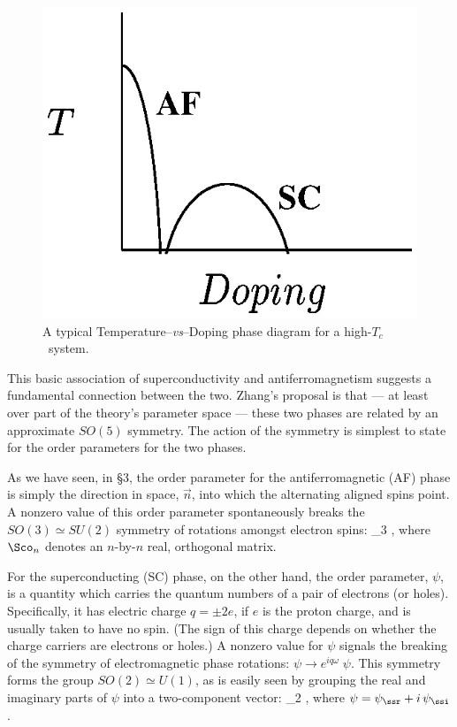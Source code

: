 \documentclass[12pt,epsf]{report}
\def\Tc{$T_c$}
\begin{document}
\begin{figure}
\includegraphics{Pdiag.eps}
\caption{A typical Temperature--{\it vs}--Doping phase
diagram for a high-\Tc\ system.}
\end{figure}


This basic association of superconductivity and 
antiferromagnetism suggests a fundamental  connection
between the two. Zhang's proposal is that --- at least over
part of the theory's parameter  space --- these two phases
are related by an approximate  $SO(5)$ symmetry. The action
of the symmetry is simplest to state for the order
parameters for the two phases.

As we have seen, in \S3, the order parameter for the
antiferromagnetic (AF) phase is simply the direction in
space, 
$\vec n$, into which the alternating aligned spins point. A
nonzero value of this order parameter spontaneously breaks
the $SO(3) 
\simeq SU(2)$ symmetry of rotations amongst electron spins: 
%
\eq
\label{sothreedef}
\to \Sco_3  \;  ,
\eeq
%
where $\Sco_n$ denotes an $n$-by-$n$ real, orthogonal
matrix.

For the superconducting (SC) phase, on the other hand, the
order parameter, $\psi$, is a quantity which carries the
quantum numbers of a pair of electrons (or holes).
Specifically, it has electric charge $q =  \pm2 e$, if $e$
is the proton charge, and is usually taken to have no
spin.  (The sign of this charge depends on whether the
charge carriers are electrons or holes.) A nonzero value
for $\psi$ signals the breaking of the symmetry of
electromagnetic phase rotations:  $\psi \to e^{iq \omega}
\; \psi$. This symmetry forms the group $SO(2) \simeq
U(1)$, as is easily seen by grouping the real and imaginary
parts of $\psi$ into a two-component vector:
%
\eq
\label{sotwodef}
\pmatrix{\psi_\ssr \cr \psi_\ssi \cr} \to 
\Sco_2  \; \pmatrix{\psi_\ssr \cr
\psi_\ssi \cr} ,  \eeq
%
where $\psi = \psi_\ssr + i \, \psi_\ssi$.
\end{document}
